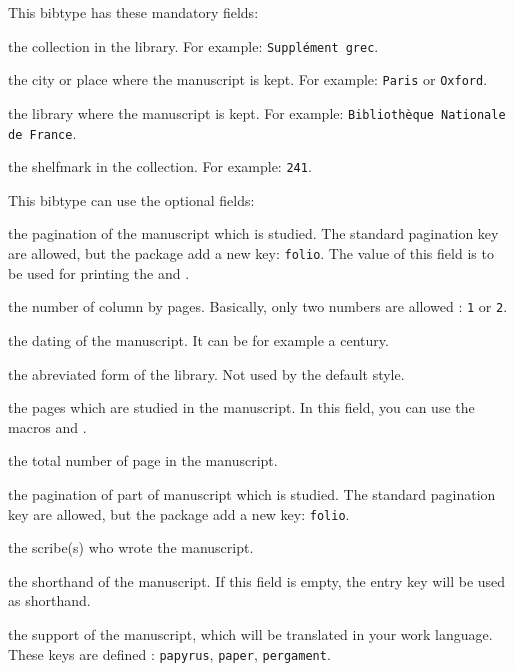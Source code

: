 \documentclass{ltxdockit}[2011/03/25]
\begin{document}
This bibtype has these mandatory fields:

\begin{fieldlist}

 the collection in the library. For example: \verb+Supplément grec+.

 the city or place where the manuscript is kept. For example: \verb+Paris+ or \verb+Oxford+. 

 the library where the manuscript is kept. For example: \verb+Bibliothèque Nationale de France+.


 the shelfmark in the collection. For example: \verb+241+.
\end{fieldlist}

This bibtype can use the optional fields:

\begin{fieldlist}

 the pagination of the manuscript which is studied. The standard pagination key are allowed, but the package add a new key: \texttt{folio}. The value of this field is to be used for printing the  and .

 the number of column by pages. Basically, only two numbers are allowed : \verb+1+ or \verb+2+.

 the dating of the manuscript. It can be for example a century.

 the abreviated form of the library. Not used by the default style.

 the pages which are studied in the manuscript. In this field, you can use the macros  and .

 the total number of page in the manuscript.


 the pagination of part of manuscript which is studied. The standard pagination key are allowed, but the package add a new key: \verb+folio+.

 the scribe(s) who wrote the manuscript.

 the shorthand of the manuscript. If this field is empty, the entry key will be used as shorthand.

 the support of the manuscript, which will be translated in your work language. These keys are defined : \texttt{papyrus}, \texttt{paper}, \texttt{pergament}.

\end{fieldlist}
\end{document}
